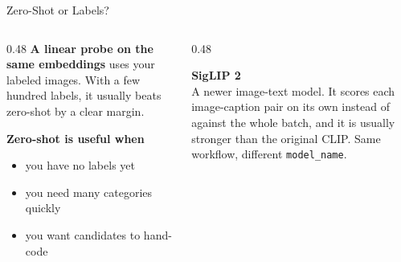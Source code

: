 \begin{frame}{Zero-Shot or Labels?}
\begin{columns}[T]
\begin{column}{0.48\textwidth}
\textbf{A linear probe on the same embeddings} uses your labeled images. With a few hundred
labels, it usually beats zero-shot by a clear margin.

\vspace{0.2cm}
\textbf{Zero-shot is useful when}
\begin{itemize}
\item you have no labels yet
\item you need many categories quickly
\item you want candidates to hand-code
\end{itemize}
\end{column}
\begin{column}{0.48\textwidth}
\begin{graybox}
\textbf{SigLIP 2} \\
A newer image-text model. It scores each image-caption pair on its own instead of against the
whole batch, and it is usually stronger than the original CLIP. Same workflow, different
\texttt{model\_name}.
\end{graybox}
\end{column}
\end{columns}
\end{frame}

